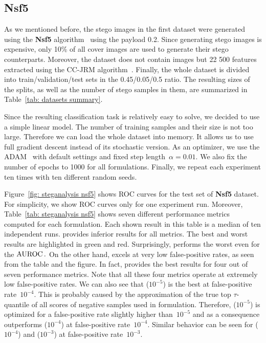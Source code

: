 \subsection{Nsf5}

As we mentioned before, the stego images in the first dataset were generated using the \textbf{Nsf5} algorithm~\cite{fridrich2007statistically} using the payload 0.2. Since generating stego images is expensive, only 10\% of all cover images are used to generate their stego counterparts. Moreover, the dataset does not contain images but 22 500 features extracted using the CC-JRM algorithm~\cite{kodovsky2012steganalysis}. Finally, the whole dataset is divided into train/validation/test sets in the 0.45/0.05/0.5 ratio. The resulting sizes of the splits, as well as the number of stego samples in them, are summarized in Table~\ref{tab: datasets summary}. 

Since the resulting classification task is relatively easy to solve, we decided to use a simple linear model. The number of training samples and their size is not too large. Therefore we can load the whole dataset into memory. It allows us to use full gradient descent instead of its stochastic version. As an optimizer, we use the ADAM~\cite{kingma2014adam} with default settings and fixed step length~$\alpha = 0.01.$ We also fix the number of epochs to 1000 for all formulations. Finally, we repeat each experiment ten times with ten different random seeds.

Figure~\ref{fig: steganalysis nsf5} shows ROC curves for the test set of \textbf{Nsf5} dataset. For simplicity, we show ROC curves only for one experiment run. Moreover, Table~\ref{tab: steganalysis nsf5} shows seven different performance metrics computed for each formulation. Each shown result in this table is a median of ten independent runs. \BaseLine provides inferior results for all metrics. The best and worst results are highlighted in green and red. Surprisingly, \BaseLine performs the worst even for the $\operatorname{AUROC}.$ On the other hand, \DeepTopPush excels at very low false-positive rates, as seen from the table and the figure. In fact, \DeepTopPush provides the best results for four out of seven performance metrics. Note that all these four metrics operate at extremely low false-positive rates. We can also see that \PatMatNP($10^{-5}$) is the best at false-positive rate~$10^{-4}$. This is probably caused by the approximation of the true top $\tau$-quantile of all scores of negative samples used in \PatMatNP formulation. Therefore, \PatMatNP($10^{-5}$) is optimized for a false-positive rate slightly higher than~$10^{-5}$ and as a consequence outperforms \PatMatNP($10^{-4}$) at false-positive rate~$10^{-4}$. Similar behavior can be seen for \PatMatNP($10^{-4}$) and \PatMatNP($10^{-3}$) at false-positive rate~$10^{-3}$.

